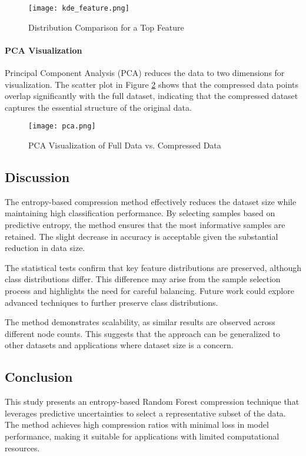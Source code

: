 \documentclass{article}
\begin{document}
\begin{figure}[H]
\centering
\texttt{[image: kde\_feature.png]}
\caption{Distribution Comparison for a Top Feature}
\label{fig:kde_feature}
\end{figure}

\paragraph{PCA Visualization}

Principal Component Analysis (PCA) reduces the data to two dimensions for visualization. The scatter plot in Figure \ref{fig:pca} shows that the compressed data points overlap significantly with the full dataset, indicating that the compressed dataset captures the essential structure of the original data.

\begin{figure}[H]
\centering
\texttt{[image: pca.png]}
\caption{PCA Visualization of Full Data vs. Compressed Data}
\label{fig:pca}
\end{figure}

\subsection{Discussion}

The entropy-based compression method effectively reduces the dataset size while maintaining high classification performance. By selecting samples based on predictive entropy, the method ensures that the most informative samples are retained. The slight decrease in accuracy is acceptable given the substantial reduction in data size.

The statistical tests confirm that key feature distributions are preserved, although class distributions differ. This difference may arise from the sample selection process and highlights the need for careful balancing. Future work could explore advanced techniques to further preserve class distributions.

The method demonstrates scalability, as similar results are observed across different node counts. This suggests that the approach can be generalized to other datasets and applications where dataset size is a concern.

\subsection{Conclusion}

This study presents an entropy-based Random Forest compression technique that leverages predictive uncertainties to select a representative subset of the data. The method achieves high compression ratios with minimal loss in model performance, making it suitable for applications with limited computational resources.
\end{document}
